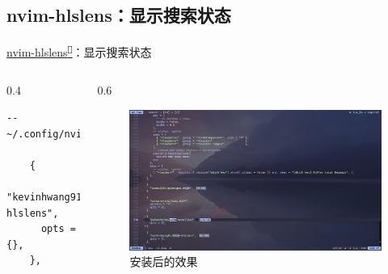 \documentclass[aspectratio=169]{ctexbeamer}
\newcommand{\nerd}[1]{\texttt{#1}}
\newcommand{\link}[3][]{\href{#3}{#2\textsuperscript{\nerd{}}}}
\begin{document}
\subsection{nvim-hlslens：显示搜索状态} %
\begin{frame}[fragile]{\link{nvim-hlslens}{https://github.com/kevinhwang91/nvim-hlslens}：显示搜索状态} %
  \begin{columns}
    \begin{column}{0.4\linewidth}
        \begin{lstlisting}[basicstyle=\tiny\ttfamily]
    -- ~/.config/nvim/lua/plugins/ui.lua

    {
      "kevinhwang91/nvim-hlslens",
      opts = {},
    },
        \end{lstlisting}
    \end{column}

    \begin{column}{0.6\linewidth}
      \begin{figure}[H]
        \centering
        \includegraphics[width=\linewidth]{./Figures/Hlslens_Finish.jpg}
        \caption{安装后的效果}%
      \end{figure}
    \end{column}
  \end{columns}
\end{frame}
\end{document}
